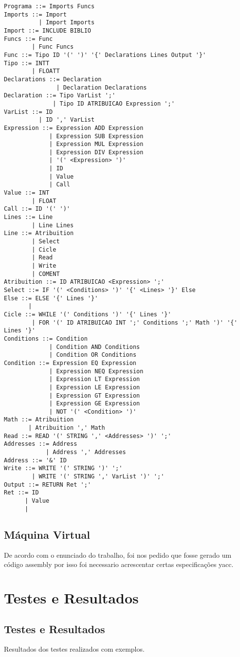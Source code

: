\documentclass[12pt,a4paper]{report}
\begin{document}
\begin{lstlisting}
Programa ::= Imports Funcs
Imports ::= Import
          | Import Imports
Import ::= INCLUDE BIBLIO
Funcs ::= Func
        | Func Funcs
Func ::= Tipo ID '(' ')' '{' Declarations Lines Output '}'
Tipo ::= INTT
        | FLOATT
Declarations ::= Declaration
               | Declaration Declarations
Declaration ::= Tipo VarList ';'
              | Tipo ID ATRIBUICAO Expression ';'
VarList ::= ID
          | ID ',' VarList
Expression ::= Expression ADD Expression
             | Expression SUB Expression
             | Expression MUL Expression
             | Expression DIV Expression
             | '(' <Expression> ')'
             | ID
             | Value
             | Call
Value ::= INT
        | FLOAT
Call ::= ID '(' ')'
Lines ::= Line
        | Line Lines
Line ::= Atribuition
        | Select
        | Cicle
        | Read
        | Write
        | COMENT
Atribuition ::= ID ATRIBUICAO <Expression> ';'
Select ::= IF '(' <Conditions> ')' '{' <Lines> '}' Else
Else ::= ELSE '{' Lines '}'
       | 
Cicle ::= WHILE '(' Conditions ')' '{' Lines '}'
        | FOR '(' ID ATRIBUICAO INT ';' Conditions ';' Math ')' '{' Lines '}'
Conditions ::= Condition
             | Condition AND Conditions
             | Condition OR Conditions
Condition ::= Expression EQ Expression
             | Expression NEQ Expression
             | Expression LT Expression
             | Expression LE Expression
             | Expression GT Expression
             | Expression GE Expression
             | NOT '(' <Condition> ')'
Math ::= Atribuition
       | Atribuition ',' Math
Read ::= READ '(' STRING ',' <Addresses> ')' ';'
Addresses ::= Address
            | Address ',' Addresses
Address ::= '&' ID
Write ::= WRITE '(' STRING ')' ';'
        | WRITE '(' STRING ',' VarList ')' ';'
Output ::= RETURN Ret ';'
Ret ::= ID
      | Value
      | 
\end{lstlisting}
\section{Máquina Virtual}
De acordo com o enunciado do trabalho, foi nos pedido que fosse gerado um código assembly por isso foi necessario acrescentar certas especificações yacc.



\chapter{Testes e Resultados}
\section{Testes e Resultados}
Resultados dos testes realizados com exemplos.
\end{document}

